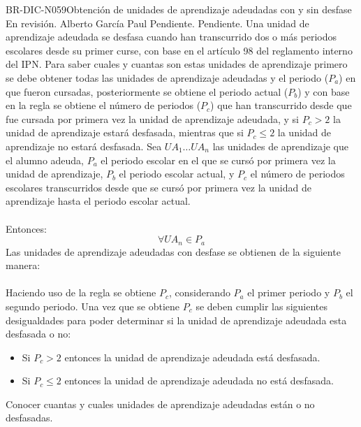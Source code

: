 \begin{BusinessRule}{BR-DIC-N059}{Obtención de unidades de aprendizaje adeudadas con y sin desfase}
	{\bcCondition} %
	{\btTimer}     %
	{\blInfluencing}     %
	\BRItem[Estado] En revisión.
	 Alberto García Paul 
	 Pendiente.
	 Pendiente. 
	\BRItem[Descripción] Una unidad de aprendizaje adeudada se desfasa cuando han transcurrido dos o más periodos escolares desde su primer curse, con base en el artículo 98 del reglamento interno del IPN. Para saber cuales y cuantas son estas unidades de aprendizaje primero se debe obtener todas las unidades de aprendizaje adeudadas y el periodo ($P_{a}$) en que fueron cursadas, posteriormente se obtiene el periodo actual ($P_{b}$) y con base en la regla  se obtiene el número de periodos ($P_{c}$) que han transcurrido desde que fue cursada por primera vez la unidad de aprendizaje adeudada, y si $P_{c} > 2$ la unidad de aprendizaje estará desfasada, mientras que si $P_{c} \leq 2$ la unidad de aprendizaje no estará desfasada.
	\BRItem[Sentencia] \cdtEmpty
	Sea $UA_{1} \ldots UA_{n}$ las unidades de aprendizaje que el alumno adeuda, $P_{a}$ el periodo escolar en el que se cursó por primera vez la unidad de aprendizaje, $P_{b}$ el periodo escolar actual, y $P_{c}$ el número de periodos escolares transcurridos desde que se cursó por primera vez la unidad de aprendizaje hasta el periodo escolar actual. \\ \\
	Entonces: \\
	\[\forall UA_{n} \in P_{a} \]
	Las unidades de aprendizaje adeudadas con desfase se obtienen de la siguiente manera:\\ \\
	Haciendo uso de la regla  se obtiene $P_{c}$, considerando $P_{a}$ el primer periodo y $P_{b}$ el segundo periodo. Una vez que se obtiene $P_{c}$ se deben cumplir las siguientes desigualdades para poder determinar si la unidad de aprendizaje adeudada esta desfasada o no:
	\begin{itemize}
		\item Si $P_{c} > 2$ entonces la unidad de aprendizaje adeudada está desfasada.
		\item Si $P_{c} \leq 2$ entonces la unidad de aprendizaje adeudada no está desfasada.
	\end{itemize}
	\BRItem[Motivación] Conocer cuantas y cuales unidades de aprendizaje adeudadas están o no desfasadas.

\end{BusinessRule}


